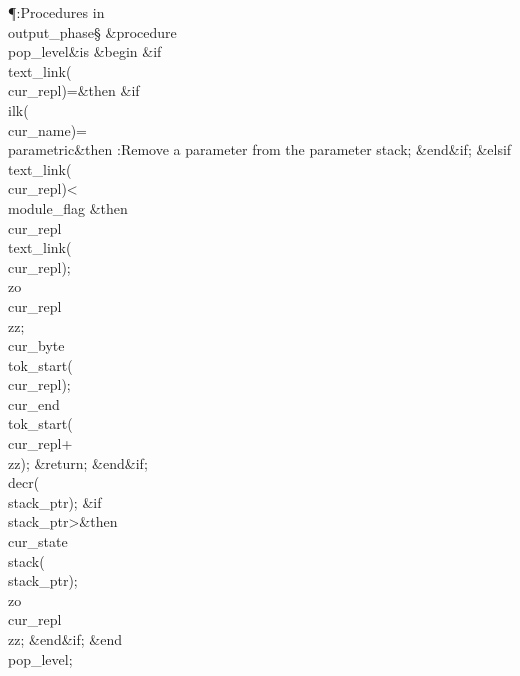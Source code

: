 \Y\P\?\4:Procedures in \\{output\_phase}\X\mathrel{+}\S\?\6
\&{procedure}\8\1\\{pop\_level}\2\8\&{is}\8\1\6
\4\&{begin}\6
\&{if}\1\1\8\\{text\_link}\?\1(\?\\{cur\_repl}\?\2)=\2\8\&{then}\6
\&{if}\1\1\8\\{ilk}\?\1(\?\\{cur\_name}\?\2)=\?\\{parametric}\2\8\&{then}\6
:Remove a parameter from the parameter stack\X;\2\6
\&{end}\8\2\&{if}\1;\6
\4\&{elsif}\1\8\\{text\_link}\?\1(\?\\{cur\_repl}\?\2)<\?\\{module\_flag}\2\8%
\&{then}\6
\\{cur\_repl}\?\K\?\\{text\_link}\?\1(\?\\{cur\_repl}\?\2)\?;\6
\\{zo}\?\K\?\\{cur\_repl}\?\?\\{zz};\5
\\{cur\_byte}\?\K\?\\{tok\_start}\?\1(\?\\{cur\_repl}\?\2)\?;\5
\\{cur\_end}\?\K\?\\{tok\_start}\?\1(\?\\{cur\_repl}\?+\?\\{zz}\?\2)\?;\6
\&{return};\2\6
\&{end}\8\2\&{if}\1;\6
\\{decr}\?\1(\?\\{stack\_ptr}\?\2)\?;\6
\&{if}\1\1\8\\{stack\_ptr}\?>\2\8\&{then}\6
\\{cur\_state}\?\K\?\\{stack}\?\1(\?\\{stack\_ptr}\?\2)\?;\5
\\{zo}\?\K\?\\{cur\_repl}\?\?\\{zz};\2\6
\&{end}\8\2\&{if}\1;\2\6
\&{end}\8\\{pop\_level};\par
\fi

